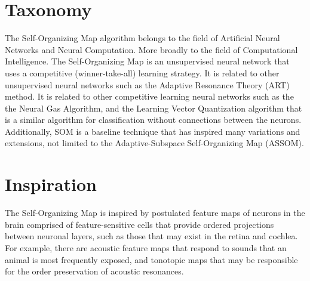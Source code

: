 \documentclass[a4paper, 11pt]{article}
\begin{document}
\section{Taxonomy}
\label{sec:taxonomy}
The Self-Organizing Map algorithm belongs to the field of Artificial Neural Networks and Neural Computation. More broadly to the field of Computational Intelligence.  
The Self-Organizing Map is an unsupervised neural network that uses a competitive (winner-take-all) learning strategy.
It is related to other unsupervised neural networks such as the Adaptive Resonance Theory (ART) method.
It is related to other competitive learning neural networks such as the the Neural Gas Algorithm, and the Learning Vector Quantization algorithm that is a similar algorithm for classification without connections between the neurons. 
Additionally, SOM is a baseline technique that has inspired many variations and extensions, not limited to the Adaptive-Subspace Self-Organizing Map (ASSOM).

\section{Inspiration}
\label{sec:inspiration}
The Self-Organizing Map is inspired by postulated feature maps of neurons in the brain comprised of feature-sensitive cells that provide ordered projections between neuronal layers, such as those that may exist in the retina and cochlea. For example, there are acoustic feature maps that respond to sounds that an animal is most frequently exposed, and tonotopic maps that may be responsible for the order preservation of acoustic resonances. 
\end{document}
